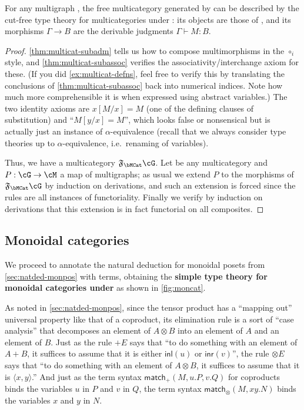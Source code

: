 \documentclass{book}
\let\types\vdash
\newcommand{\F}[1]{\mathfrak{F}_{#1}}
\def\pair#1#2{\langle #1,#2\rangle}
\def\plusE{\mathord{+}E}
\def\inl{\mathsf{inl}}
\def\inr{\mathsf{inr}}
\def\case{\mathsf{match}_+}
\def\match{\mathsf{match}}
\let\tensor\otimes
\def\tensorE{\mathord{\tensor}E}
\begin{document}
\begin{thm}\label{thm:multicat-initial}
  For any multigraph \cG, the free multicategory generated by \cG can be described by the cut-free type theory for multicategories under \cG: its objects are those of \cG, and its morphisms $\Gamma\to B$ are the derivable judgments $\Gamma\types M:B$.
\end{thm}
\begin{proof}
  \cref{thm:multicat-subadm} tells us how to compose multimorphisms in the $\circ_i$ style, and \cref{thm:multicat-subassoc} verifies the associativity/interchange axiom for these.
  (If you did \cref{ex:multicat-defns}, feel free to verify this by translating the conclusions of \cref{thm:multicat-subassoc} back into numerical indices.
  Note how much more comprehensible it is when expressed using abstract variables.)
  The two identity axioms are $x[M/x]=M$ (one of the defining clauses of substitution) and ``$M[y/x] = M$'', which looks false or nonsensical but is actually just an instance of $\alpha$-equivalence (recall that we always consider type theories up to $\alpha$-equivalence, i.e.\ renaming of variables).

  Thus, we have a multicategory $\F\bMCat\cG$.
  Let \cM be any multicategory and $P:\cG\to\cM$ a map of multigraphs; as usual we extend $P$ to the morphisms of $\F\bMCat\cG$ by induction on derivations, and such an extension is forced since the rules are all instances of functoriality.
  Finally we verify by induction on derivations that this extension is in fact functorial on all composites.
\end{proof}


\subsection{Monoidal categories}
\label{sec:moncat}

We proceed to annotate the natural deduction for monoidal posets from \cref{sec:natded-monpos} with terms, obtaining the \textbf{simple type theory for monoidal categories under \cG} as shown in \cref{fig:moncat}.

As noted in \cref{sec:natded-monpos}, since the tensor product has a ``mapping out'' universal property like that of a coproduct, its elimination rule is a sort of ``case analysis'' that decomposes an element of $A\tensor B$ into an element of $A$ and an element of $B$.
Just as the rule $\plusE$ says that ``to do something with an element of $A+B$, it suffices to assume that it is either $\inl(u)$ or $\inr(v)$'', the rule $\tensorE$ says that ``to do something with an element of $A\tensor B$, it suffices to assume that it is $\pair{x}{y}$.''
And just as the term syntax $\case(M,u.P,v.Q)$ for coproducts binds the variables $u$ in $P$ and $v$ in $Q$, the term syntax $\match_\tensor(M,xy.N)$ binds the variables $x$ and $y$ in $N$.
\end{document}
